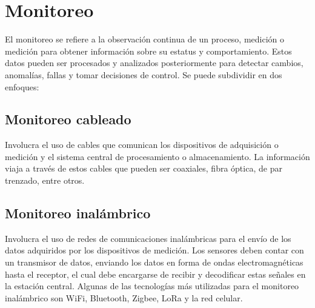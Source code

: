 \section{Monitoreo}

El monitoreo se refiere a la observación continua de un proceso, medición o medición para obtener información sobre su estatus y comportamiento. Estos datos pueden ser procesados y analizados posteriormente para detectar cambios, anomalías, fallas y tomar decisiones de control. Se puede subdividir en dos enfoques:

\subsection{Monitoreo cableado} Involucra el uso de cables que comunican los dispositivos de adquisición o medición y el sistema central de procesamiento o almacenamiento. La información viaja a través de estos cables que pueden ser coaxiales, fibra óptica, de par trenzado, entre otros. 

\subsection{Monitoreo inalámbrico} Involucra el uso de redes de comunicaciones inalámbricas para el envío de los datos adquiridos por los dispositivos de medición. Los sensores deben contar con un transmisor de datos, enviando los datos en forma de ondas electromagnéticas hasta el receptor, el cual debe encargarse de recibir y decodificar estas señales en la estación central. Algunas de las tecnologías más utilizadas para el monitoreo inalámbrico son WiFi, Bluetooth, Zigbee, LoRa y la red celular. 

